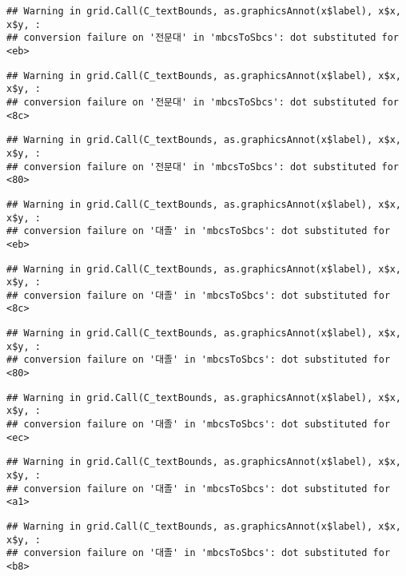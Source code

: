 \documentclass[
]{article}
\begin{document}
\begin{verbatim}
## Warning in grid.Call(C_textBounds, as.graphicsAnnot(x$label), x$x, x$y, :
## conversion failure on '전문대' in 'mbcsToSbcs': dot substituted for <eb>
\end{verbatim}

\begin{verbatim}
## Warning in grid.Call(C_textBounds, as.graphicsAnnot(x$label), x$x, x$y, :
## conversion failure on '전문대' in 'mbcsToSbcs': dot substituted for <8c>
\end{verbatim}

\begin{verbatim}
## Warning in grid.Call(C_textBounds, as.graphicsAnnot(x$label), x$x, x$y, :
## conversion failure on '전문대' in 'mbcsToSbcs': dot substituted for <80>
\end{verbatim}

\begin{verbatim}
## Warning in grid.Call(C_textBounds, as.graphicsAnnot(x$label), x$x, x$y, :
## conversion failure on '대졸' in 'mbcsToSbcs': dot substituted for <eb>
\end{verbatim}

\begin{verbatim}
## Warning in grid.Call(C_textBounds, as.graphicsAnnot(x$label), x$x, x$y, :
## conversion failure on '대졸' in 'mbcsToSbcs': dot substituted for <8c>
\end{verbatim}

\begin{verbatim}
## Warning in grid.Call(C_textBounds, as.graphicsAnnot(x$label), x$x, x$y, :
## conversion failure on '대졸' in 'mbcsToSbcs': dot substituted for <80>
\end{verbatim}

\begin{verbatim}
## Warning in grid.Call(C_textBounds, as.graphicsAnnot(x$label), x$x, x$y, :
## conversion failure on '대졸' in 'mbcsToSbcs': dot substituted for <ec>
\end{verbatim}

\begin{verbatim}
## Warning in grid.Call(C_textBounds, as.graphicsAnnot(x$label), x$x, x$y, :
## conversion failure on '대졸' in 'mbcsToSbcs': dot substituted for <a1>
\end{verbatim}

\begin{verbatim}
## Warning in grid.Call(C_textBounds, as.graphicsAnnot(x$label), x$x, x$y, :
## conversion failure on '대졸' in 'mbcsToSbcs': dot substituted for <b8>
\end{verbatim}
\end{document}
